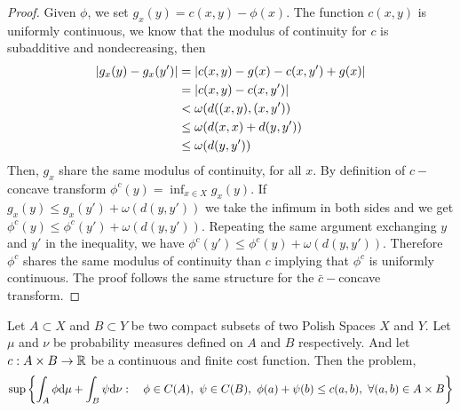 \begin{proof}
	Given $\phi$, we set $g_x(y)=c(x,y)-\phi(x)$. The function $c(x,y)$ is uniformly continuous, we know that the modulus of continuity for $c$ is subadditive and nondecreasing, then
	\begin{align*}	
	\left| g_x(y)-g_x(y') \right|&=\left| c(x,y)-g(x)-c(x,y')+g(x) \right|\\
	&=\left| c(x,y)-c(x,y') \right|\\
&<\omega(d((x,y),(x,y'))\\
	&\leq\omega(d(x,x)+d(y,y'))\\
	&\leq\omega(d(y,y'))
	\end{align*} 
 Then, $g_x$ share the same modulus of continuity, for all $x$. By definition of $c-$concave transform  $\phi^c(y)=\inf_{x\in X} g_x(y)$. If $g_x(y)\leq g_x(y')+\omega(d(y,y'))$ we take the infimum in both sides and we get $\phi^c(y)\leq \phi^c(y')+\omega(d(y,y'))$. Repeating the same argument exchanging $y$ and $y'$ in the inequality, we have $\phi^c(y')\leq \phi^c(y)+\omega(d(y,y'))$. Therefore $\phi^c$ shares the same modulus of continuity than $c$ implying that $\phi^c$ is uniformly continuous. The proof follows the same structure for the $\bar{c}-$concave transform. 
\end{proof}
\begin{theorem}
	Let $A\subset X$ and $B\subset Y$ be two compact subsets of two Polish Spaces $X$ and $Y$. Let $\mu$ and $\nu$ be probability measures defined on $A$ and $B$ respectively. And let $c:A\times B\rightarrow \mathbb{R}$ be a continuous and finite cost function. Then the problem, 
	\begin{equation*}
		\sup\braces{\int_A \phi \dmu+\int_B \psi \dnu:\quad \phi\in C(A),\ \psi \in C(B),\ \phi(a)+\psi(b)\leq c(a,b),\ \forall (a,b)\in A\times B}
	\end{equation*} 
\end{theorem}
